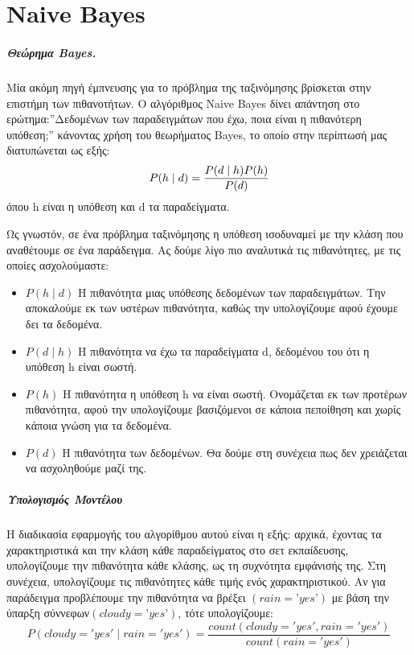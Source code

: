 \chapter{Naive Bayes}
\label{appendix:NBayes}
\paragraph{Θεώρημα Bayes.} Μία ακόμη πηγή έμπνευσης για το πρόβλημα της ταξινόμησης βρίσκεται στην επιστήμη των πιθανοτήτων. Ο αλγόριθμος Naive Bayes δίνει απάντηση στο ερώτημα:”Δεδομένων των
παραδειγμάτων που έχω, ποια είναι η πιθανότερη υπόθεση;” κάνοντας χρήση του θεωρήματος Bayes, το οποίο στην περίπτωσή μας διατυπώνεται ως εξής: 
\begin{equation}
P(h \mid d)= \frac{P(d \mid h) P(h)}{P(d)}$$
\end{equation}
όπου h είναι η υπόθεση και d τα παραδείγματα.

Ως γνωστόν, σε ένα πρόβλημα ταξινόμησης η υπόθεση ισοδυναμεί με την κλάση που αναθέτουμε σε ένα παράδειγμα. Ας δούμε λίγο πιο αναλυτικά τις πιθανότητες, με τις οποίες ασχολούμαστε:
\begin{itemize}
	\item $P(h \mid d)$ Η πιθανότητα μιας υπόθεσης δεδομένων των παραδειγμάτων. Την αποκαλούμε εκ των υστέρων πιθανότητα, καθώς την υπολογίζουμε αφού έχουμε δει τα δεδομένα.
	\item $P(d \mid h)$ Η πιθανότητα να έχω τα παραδείγματα d, δεδομένου του ότι η υπόθεση h είναι σωστή.
	\item $P( h)$ Η πιθανότητα η υπόθεση h να είναι σωστή. Ονομάζεται εκ των προτέρων πιθανότητα, αφού την υπολογίζουμε βασιζόμενοι σε κάποια πεποίθηση και χωρίς κάποια γνώση για τα δεδομένα.
	\item $P(d)$ Η πιθανότητα των δεδομένων. Θα δούμε στη συνέχεια πως δεν χρειάζεται να ασχοληθούμε μαζί της.
\end{itemize}
\paragraph{Υπολογισμός Μοντέλου} Η διαδικασία εφαρμογής του αλγορίθμου αυτού είναι η εξής: αρχικά, έχοντας τα χαρακτηριστικά και την κλάση κάθε παραδείγματος στο σετ εκπαίδευσης, υπολογίζουμε την πιθανότητα κάθε κλάσης, ως τη συχνότητα εμφάνισής της. Στη συνέχεια, υπολογίζουμε τις πιθανότητες κάθε τιμής ενός χαρακτηριστικού. Αν για παράδειγμα προβλέπουμε την πιθανότητα να βρέξει $(rain=’yes’)$ με βάση την ύπαρξη σύννεφων$(cloudy=’yes’)$, τότε υπολογίζουμε:
\begin{equation}
P(cloudy= 'yes' \mid rain='yes')= \frac{count(cloudy='yes' , rain ='yes')}{count(rain='yes')}
\end{equation}
